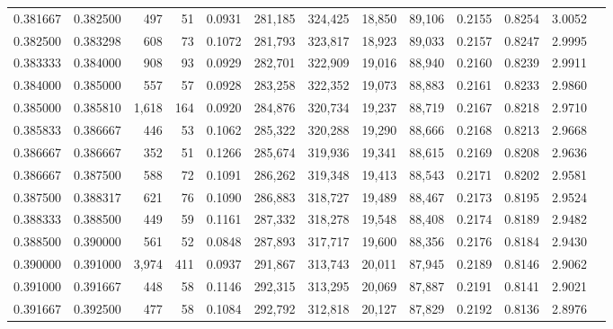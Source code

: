 \begin{tabular}{rrrrrrrrrrrrr}
0.381667 & 0.382500 &   497 &  51 &                                     0.0931 & 281,185 & 324,425 &  18,850 &  89,106 & 0.2155 & 0.8254 & 3.0052 \\
0.382500 & 0.383298 &   608 &  73 &                                     0.1072 & 281,793 & 323,817 &  18,923 &  89,033 & 0.2157 & 0.8247 & 2.9995 \\
0.383333 & 0.384000 &   908 &  93 &                                     0.0929 & 282,701 & 322,909 &  19,016 &  88,940 & 0.2160 & 0.8239 & 2.9911 \\
0.384000 & 0.385000 &   557 &  57 &                                     0.0928 & 283,258 & 322,352 &  19,073 &  88,883 & 0.2161 & 0.8233 & 2.9860 \\
0.385000 & 0.385810 & 1,618 & 164 &                                     0.0920 & 284,876 & 320,734 &  19,237 &  88,719 & 0.2167 & 0.8218 & 2.9710 \\
0.385833 & 0.386667 &   446 &  53 &                                     0.1062 & 285,322 & 320,288 &  19,290 &  88,666 & 0.2168 & 0.8213 & 2.9668 \\
0.386667 & 0.386667 &   352 &  51 &                                     0.1266 & 285,674 & 319,936 &  19,341 &  88,615 & 0.2169 & 0.8208 & 2.9636 \\
0.386667 & 0.387500 &   588 &  72 &                                     0.1091 & 286,262 & 319,348 &  19,413 &  88,543 & 0.2171 & 0.8202 & 2.9581 \\
0.387500 & 0.388317 &   621 &  76 &                                     0.1090 & 286,883 & 318,727 &  19,489 &  88,467 & 0.2173 & 0.8195 & 2.9524 \\
0.388333 & 0.388500 &   449 &  59 &                                     0.1161 & 287,332 & 318,278 &  19,548 &  88,408 & 0.2174 & 0.8189 & 2.9482 \\
0.388500 & 0.390000 &   561 &  52 &                                     0.0848 & 287,893 & 317,717 &  19,600 &  88,356 & 0.2176 & 0.8184 & 2.9430 \\
0.390000 & 0.391000 & 3,974 & 411 &                                     0.0937 & 291,867 & 313,743 &  20,011 &  87,945 & 0.2189 & 0.8146 & 2.9062 \\
0.391000 & 0.391667 &   448 &  58 &                                     0.1146 & 292,315 & 313,295 &  20,069 &  87,887 & 0.2191 & 0.8141 & 2.9021 \\
0.391667 & 0.392500 &   477 &  58 &                                     0.1084 & 292,792 & 312,818 &  20,127 &  87,829 & 0.2192 & 0.8136 & 2.8976 \\

\end{tabular}
